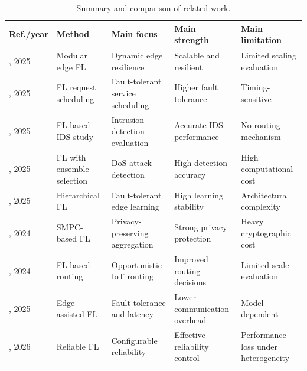 \documentclass[5p,times,numafflabel]{elsarticle}
\begin{document}
	\begin{table}[!t]
		\caption{Summary and comparison of related work.}
		\label{tab:related-work}
		\centering
		\scriptsize
		\setlength{\tabcolsep}{2.5pt}
		\renewcommand{\arraystretch}{0.96}
		
		\begin{tabularx}{\textwidth}{@{}l p{2.6cm} Y Y Y@{}}
			\toprule
			Ref./year & Method & Main focus & Main strength & Main limitation \\
			\midrule
			
			\cite{almeida2025modular}, 2025
			& Modular edge FL
			& Dynamic edge resilience
			& Scalable and resilient
			& Limited scaling evaluation \\
			
			\cite{aburukba2025scheduling}, 2025
			& FL request scheduling
			& Fault-tolerant service scheduling
			& Higher fault tolerance
			& Timing-sensitive \\
			
			\cite{albanbay2025ids}, 2025
			& FL-based IDS study
			& Intrusion-detection evaluation
			& Accurate IDS performance
			& No routing mechanism \\
			
			\cite{alghadi2025dos}, 2025
			& FL with ensemble selection
			& DoS attack detection
			& High detection accuracy
			& High computational cost \\
			
			\cite{chen2025hierarchical}, 2025
			& Hierarchical FL
			& Fault-tolerant edge learning
			& High learning stability
			& Architectural complexity \\
			
			\cite{geng2024smpc}, 2024
			& SMPC-based FL
			& Privacy-preserving aggregation
			& Strong privacy protection
			& Heavy cryptographic cost \\
			
			\cite{bhardwaj2024routing}, 2024
			& FL-based routing
			& Opportunistic IoT routing
			& Improved routing decisions
			& Limited-scale evaluation \\
			
			\cite{haripriya2025fault}, 2025
			& Edge-assisted FL
			& Fault tolerance and latency
			& Lower communication overhead
			& Model-dependent \\
			
			\cite{liu2026reliability}, 2026
			& Reliable FL
			& Configurable reliability
			& Effective reliability control
			& Performance loss under heterogeneity \\
			

\end{tabularx}
\end{table}
\end{document}
